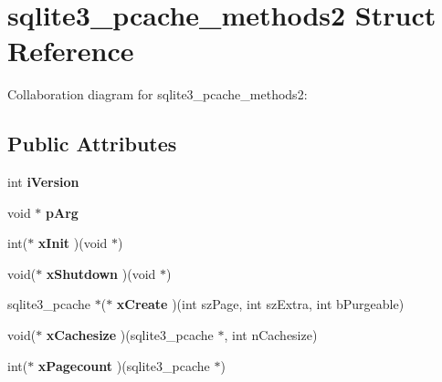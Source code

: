 \hypertarget{structsqlite3__pcache__methods2}{\section{sqlite3\+\_\+pcache\+\_\+methods2 Struct Reference}
\label{structsqlite3__pcache__methods2}
}


Collaboration diagram for sqlite3\+\_\+pcache\+\_\+methods2\+:
\subsection*{Public Attributes}
\begin{DoxyCompactItemize}
\item 
\hypertarget{structsqlite3__pcache__methods2_a03b27be6c7cb8f1d2662c454cbe58483}{int {\bfseries i\+Version}}\label{structsqlite3__pcache__methods2_a03b27be6c7cb8f1d2662c454cbe58483}

\item 
\hypertarget{structsqlite3__pcache__methods2_a4bea91c33987eef02122bbf8a49745de}{void $\ast$ {\bfseries p\+Arg}}\label{structsqlite3__pcache__methods2_a4bea91c33987eef02122bbf8a49745de}

\item 
\hypertarget{structsqlite3__pcache__methods2_a8f77114458576c9d75cd53822fcd3462}{int($\ast$ {\bfseries x\+Init} )(void $\ast$)}\label{structsqlite3__pcache__methods2_a8f77114458576c9d75cd53822fcd3462}

\item 
\hypertarget{structsqlite3__pcache__methods2_a00a780e295b89976940cd3cba2cfeaee}{void($\ast$ {\bfseries x\+Shutdown} )(void $\ast$)}\label{structsqlite3__pcache__methods2_a00a780e295b89976940cd3cba2cfeaee}

\item 
\hypertarget{structsqlite3__pcache__methods2_a91e7752b826e19e7c51c1fa0ce530f0f}{sqlite3\+\_\+pcache $\ast$($\ast$ {\bfseries x\+Create} )(int sz\+Page, int sz\+Extra, int b\+Purgeable)}\label{structsqlite3__pcache__methods2_a91e7752b826e19e7c51c1fa0ce530f0f}

\item 
\hypertarget{structsqlite3__pcache__methods2_a4889ab0903938f485aa0fa4fc6925d26}{void($\ast$ {\bfseries x\+Cachesize} )(sqlite3\+\_\+pcache $\ast$, int n\+Cachesize)}\label{structsqlite3__pcache__methods2_a4889ab0903938f485aa0fa4fc6925d26}

\item 
\hypertarget{structsqlite3__pcache__methods2_a5d51aba3927db1da9acf31fbdf7d57b5}{int($\ast$ {\bfseries x\+Pagecount} )(sqlite3\+\_\+pcache $\ast$)}\label{structsqlite3__pcache__methods2_a5d51aba3927db1da9acf31fbdf7d57b5}


\end{DoxyCompactItemize}
